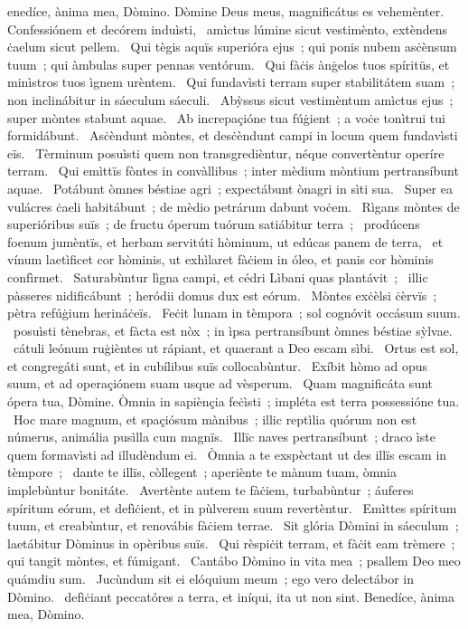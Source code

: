 \psalmChapterWithInscription{}
{ }
{%
enedíce, ànima mea, Dòmino. Dòmine Deus meus, magnificátus es vehemènter. Confessiónem et decórem induìsti, 
~amìctus lúmine sicut vestimènto, extèndens ċaelum sicut pellem. 
~Qui tègis aquïs superióra ejus~; qui ponis nubem asċènsum tuum~; qui àmbulas super pennas ventórum. 
~Qui fàċis ànġelos tuos spíritüs, et minìstros tuos ìgnem urèntem. 
~Qui fundavìsti terram super stabilitátem suam~; non inclinábitur in sáeculum sáeculi. 
~Abỳssus sicut vestimèntum amìctus ejus~; super mòntes stabunt aquae. 
~Ab increpaçióne tua fúġient~; a voċe tonìtrui tui formidábunt. 
~Asċèndunt mòntes, et desċèndunt campi in locum quem fundavìsti eïs. 
~Tèrminum posuìsti quem non transgredièntur, néque convertèntur operíre terram. 
~Qui emìttïs fòntes in convàllibus~; inter mèdium mòntium pertransíbunt aquae. 
~Potábunt òmnes béstiae agri~; expectábunt ònagri in sìti sua. 
~Super ea vulácres ċaeli habitábunt~; de mèdio petrárum dabunt voċem. 
~Rìgans mòntes de superióribus suïs~; de fructu óperum tuórum satiábitur terra~; 
~prodúcens foenum jumèntïs, et herbam servitúti hòminum, ut edúcas panem de terra, 
~et vínum laetìficet cor hòminis, ut exhìlaret fàċiem in óleo, et panis cor hòminis confìrmet. 
~Saturabùntur lìgna campi, et cédri Lìbani quas plantávit~;
~illic pàsseres nidificábunt~; heródii domus dux est eórum. 
~Mòntes exċèlsi ċèrvïs~; pètra refúġium herináċeïs. 
~Feċit lunam in tèmpora~; sol cognóvit occásum suum. 
~posuìsti tènebras, et fàcta est nòx~; in ìpsa pertransíbunt òmnes béstiae sỳlvae. 
~cátuli leónum ruġièntes ut rápiant, et quaerant a Deo escam sìbi. 
~Ortus est sol, et congregáti sunt, et in cubílibus suïs collocabùntur. 
~Exíbit hòmo ad opus suum, et ad operaçiónem suam usque ad vèsperum. 
~Quam magnificáta sunt ópera tua, Dòmine. Òmnia in sapiènçia feċìsti~; impléta est terra possessióne tua. 
~Hoc mare magnum, et spaçiósum mànibus~; illic reptìlia quórum non est númerus, animália pusìlla cum magnïs. 
~Illïc naves pertransíbunt~; draco ìste quem formavìsti ad illudèndum ei. 
~Òmnia a te exspèctant ut des illïs escam in tèmpore~; 
~dante te illïs, còllegent~; aperiènte te mànum tuam, òmnia implebùntur bonitáte. 
~Avertènte autem te fàċiem, turbabùntur~; áuferes spíritum eórum, et defìċient, et in pùlverem suum revertèntur. 
~Emìttes spíritum tuum, et creabùntur, et renovábis fàċiem terrae. 
~Sit glória Dòmini in sáeculum~; laetábitur Dòminus in opèribus suïs. 
~Qui rèspiċit terram, et fàċit eam trèmere~; qui tangit mòntes, et fúmigant. 
~Cantábo Dòmino in vita mea~; psallem Deo meo quámdiu sum. 
~Jucùndum sit ei elóquium meum~; ego vero delectábor in Dòmino. 
~defìċiant peccatóres a terra, et iníqui, ita ut non sint. Benedíce, ànima mea, Dòmino. 
}
